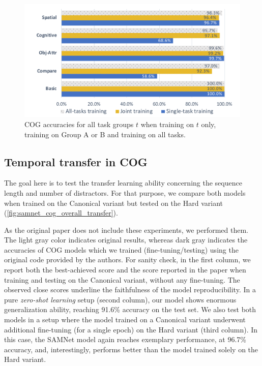  \begin{figure}
 	\centering
 	\includegraphics[width=\columnwidth]{img/results/COG_reasoning_transfer}
 	\caption{COG accuracies for all task groups $t$ when training on $t$ only, training on Group A or B and training on all tasks.}
 	\label{fig:COG-reasoning-results}
 \end{figure}
 

\subsection{Temporal transfer in COG}
\label{sec:temporal}


The goal here is to test the transfer learning ability concerning the sequence length and number of distractors.
For that purpose, we compare both models when trained on the Canonical variant but tested on the 
Hard variant (\cref{fig:samnet_cog_overall_transfer}).

As the original paper does not include these experiments, we performed them. The light gray color indicates original results, whereas dark gray indicates the accuracies of COG models which we trained (fine-tuning/testing) using the original code provided by the authors.
For sanity check, in the first column, we report both the best-achieved score and the score reported in the paper when training and testing on the Canonical variant, without any fine-tuning. The observed close scores underline the faithfulness of the model reproducibility.
In a pure \textit{zero-shot learning} setup (second column), our model shows enormous generalization ability, reaching 91.6\% accuracy on the test set.
We also test both models in a setup where the model trained on a Canonical variant underwent additional fine-tuning (for a single epoch) on the Hard variant (third column).
In this case, the SAMNet model again reaches exemplary performance, at 96.7\% accuracy, and, interestingly, performs better than the model trained solely on the Hard variant.

